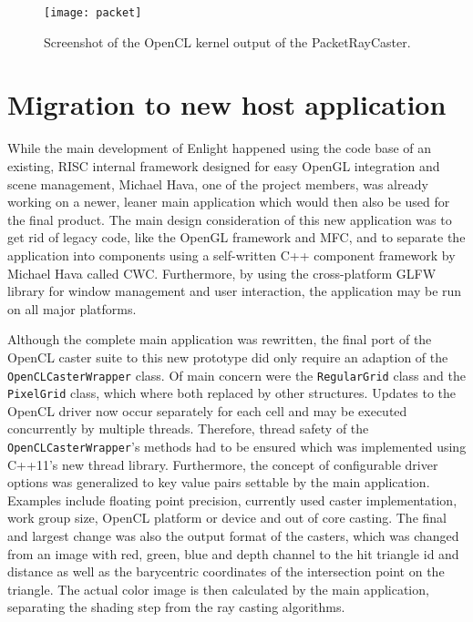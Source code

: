 \begin{figure}[h]
\centering
\texttt{[image: packet]}
\caption{Screenshot of the OpenCL kernel output of the PacketRayCaster.}
\label{fig:packet}
\end{figure}

\pagebreak

\section{Migration to new host application}
\label{sec:migration}

While the main development of Enlight happened using the code base of an existing, RISC internal framework designed for easy OpenGL integration and scene management, Michael Hava, one of the project members, was already working on a newer, leaner main application which would then also be used for the final product. The main design consideration of this new application was to get rid of legacy code, like the OpenGL framework and MFC, and to separate the application into components using a self-written C++ component framework by Michael Hava called CWC. Furthermore, by using the cross-platform GLFW library for window management and user interaction, the application may be run on all major platforms.

Although the complete main application was rewritten, the final port of the OpenCL caster suite to this new prototype did only require an adaption of the \lstinline!OpenCLCasterWrapper! class. Of main concern were the \lstinline!RegularGrid! class and the \lstinline!PixelGrid! class, which where both replaced by other structures. Updates to the OpenCL driver now occur separately for each cell and may be executed concurrently by multiple threads. Therefore, thread safety of the \lstinline!OpenCLCasterWrapper!'s methods had to be ensured which was implemented using C++11's new thread library. Furthermore, the concept of configurable driver options was generalized to key value pairs settable by the main application. Examples include floating point precision, currently used caster implementation, work group size, OpenCL platform or device and out of core casting. The final and largest change was also the output format of the casters, which was changed from an image with red, green, blue and depth channel to the hit triangle id and distance as well as the barycentric coordinates of the intersection point on the triangle. The actual color image is then calculated by the main application, separating the shading step from the ray casting algorithms.


